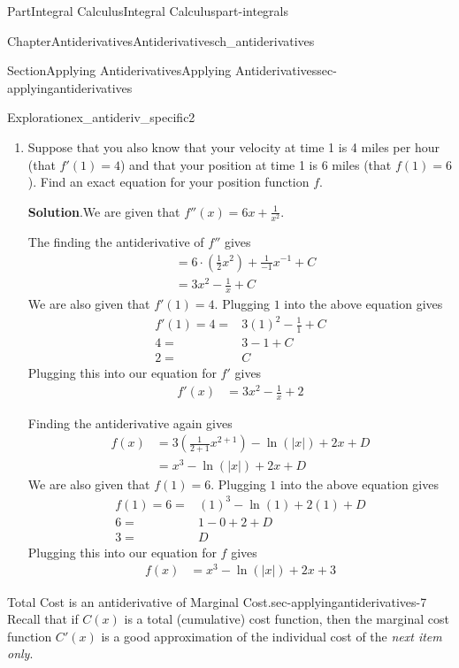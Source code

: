 \documentclass[oneside,10pt,]{tufte-book}
\newcommand{\blocktitlefont}{\relax}
\numberwithin{equation}{chapter}
\newcommand{\amp}{&}
\begin{document}
\begin{partptx}{Part}{Integral Calculus}{}{Integral Calculus}{}{}{part-integrals}
\begin{chapterptx}{Chapter}{Antiderivatives}{}{Antiderivatives}{}{}{ch_antiderivatives}
\begin{sectionptx}{Section}{Applying Antiderivatives}{}{Applying Antiderivatives}{}{}{sec-applyingantiderivatives}
\begin{exploration}{Exploration}{}{ex_antideriv_specific2}
\begin{enumerate}[font=\bfseries,label=(\alph*),ref=\alph*]
\begin{equation*}
\end{equation*}
for some unknown constants \(C,D\)%
\item{}Suppose that you also know that your velocity at time 1 is 4 miles per hour (that \(f'(1)=4\)) and that your position at time 1 is 6 miles (that \(f(1)=6\)). Find an exact equation for your position function \(f\).%
\par\smallskip%
\noindent\textbf{\blocktitlefont Solution}.\hypertarget{ex_antideriv_specific2-3-2}{}\quad{}We are given that  \(f''(x) = 6x + \frac{1}{x^2}\).%
\par
The finding the  antiderivative of \(f''\) gives%
\begin{align*}
\amp = 6\cdot(\frac{1}{2} x^2) + \frac{1}{-1}x^{-1} + C\\
\amp = 3 x^2  - \frac{1}{x} + C 
\end{align*}
We are also given that \(f'(1)=4\).  Plugging \(1\) into the above equation gives%
\begin{align*}
f'(1)= 4 = \amp 3(1)^2 - \frac{1}{1} + C\\
4 = \amp 3 - 1 + C\\
2 = \amp C
\end{align*}
Plugging this into our equation for \(f'\) gives%
\begin{align*}
f'(x) \amp = 3 x^2  - \frac{1}{x} + 2 
\end{align*}
%
\par
Finding the antiderivative again gives%
\begin{align*}
f(x) \amp = 3(\frac{1}{2+1}x^{2+1}) - \ln(|x|) + 2x + D\\
\amp = x^3 - \ln(|x|) + 2x + D
\end{align*}
We are also given that \(f(1) = 6\).  Plugging \(1\) into the above equation gives%
\begin{align*}
f(1)=6= \amp  (1)^3 - \ln(1) + 2(1) + D \\
6 = \amp 1-0+2+D \\
3 = \amp D
\end{align*}
Plugging this into our equation for \(f\) gives%
\begin{align*}
f(x)  \amp = x^3 - \ln(|x|) + 2x + 3
\end{align*}
%
\end{enumerate}%
\end{exploration}%
\begin{paragraphs}{Total Cost is an antiderivative of Marginal Cost.}{sec-applyingantiderivatives-7}%
Recall that if \(C(x)\) is a total (cumulative) cost function, then the marginal cost function \(C'(x)\) is a good approximation of the individual cost of the \emph{next item only}.%

\end{paragraphs}
\end{sectionptx}
\end{chapterptx}
\end{partptx}
\end{document}
